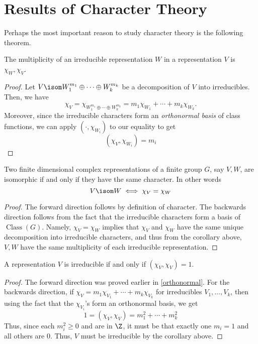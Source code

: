 \documentclass[11pt,leqno,oneside]{amsbook}
\newcommand{\Class}{\operatorname{Class}}
\numberwithin{thm}{section}
\begin{document}
\section{Results of Character Theory}
Perhaps the most important reason to study character theory is the
following theorem.
\begin{cor}
  The multiplicity of an irreducible representation \(W\) in a
  representation \(V\) is \(\chi_W, \chi_V\). 
\end{cor}
\begin{proof}
  Let \(V \isom W_1^{m_1} \oplus \cdots \oplus W_k^{m_k}\) be a
  decomposition of \(V\) into irreducibles. Then, we have \[
    \chi_V = \chi_{W_1^{m_1} \oplus \cdots \oplus W_k^{m_k}} = m_1
    \chi_{W_1} + \cdots + m_k \chi_{W_k}.
  \]
  Moreover, since the irreducible characters form an \emph{orthonormal
  basis} of class functions, we can apply \((\cdot, \chi_{W_i})\) to
  our equality to get \[
    (\chi_V, \chi_{W_i}) = m_i
  \]
\end{proof}
\begin{cor}
  Two finite dimensional complex representations of a finite group
  \(G\), say \(V,W\), are isomorphic if and only if they have the same
  character. In other words \[
    V \isom W \iff \chi_V = \chi_W
  \]
\end{cor}
\begin{proof}
  The forward direction follows by definition of character. The
  backwards direction follows from the fact that the irreducible characters form a
  basis of \(\Class(G)\). Namely, \(\chi_V = \chi_W\) implies that
  \(\chi_V\) and \(\chi_W\) have the same unique decomposition into
  irreducible characters, and thus from the corollary above, \(V,W\) have the
  same multiplicity of each irreducible representation.
\end{proof}
\begin{cor}
  A representation \(V\) is irreducible if and only if \((\chi_V,
  \chi_V) = 1\). 
\end{cor}
\begin{proof}
  The forward direction was proved earlier in \ref{orthonormal}. For the
  backwards direction, if \(\chi_V = m_1 \chi_{V_1} + \cdots + m_k
  \chi_{V_k}\) for irreducibles \(V_1, \ldots, V_k\), then using the
  fact that the \(\chi_{V_i}\)'s form an orthonormal basis, we get \[
    1 = (\chi_V, \chi_V) = m_1^2 + \cdots + m_k^2
  \]
  Thus, since each \(m_i^2 \geq 0\) and are in \(\Z\), it must be that
  exactly one \(m_i = 1\) and all others are \(0\). Thus, \(V\) must
  be irreducible by the corollary above.
\end{proof}
\end{document}
